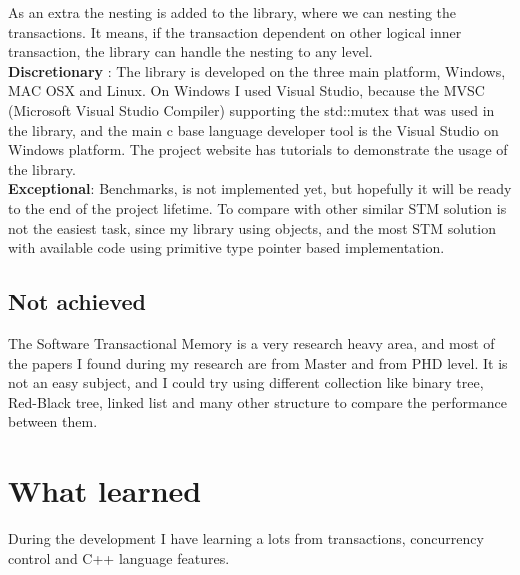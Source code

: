 \documentclass[12pt]{article}
\begin{document}
As an extra the nesting is added to the library, where we can nesting the transactions. It means, if the transaction dependent on other logical inner transaction, the library can  handle the nesting to any level.\\

\textbf{Discretionary} : The library is developed on the three main platform, Windows, MAC OSX and Linux. On Windows I used Visual Studio, because the MVSC (Microsoft Visual Studio Compiler) supporting the std::mutex that was used in the library, and the main c base language developer tool is the Visual Studio on Windows platform. The project website has tutorials to demonstrate the usage of the library.\\

\textbf{Exceptional}: Benchmarks, is not implemented yet, but hopefully it will be ready to the end of the project lifetime. To compare with other similar STM solution is not the easiest task, since my library using objects, and the most STM solution with available code using primitive type pointer based implementation. 

\subsection{Not achieved}
The Software Transactional Memory is a very research heavy area, and most of the papers I found during my research are from Master and from PHD level. It is not an easy subject, and I could try using different collection like binary tree, Red-Black tree, linked list and many other structure to compare the performance between them.\\


\newpage
\section{What learned}
During the development I have learning a lots from transactions, concurrency control and C++ language features.
\end{document}
